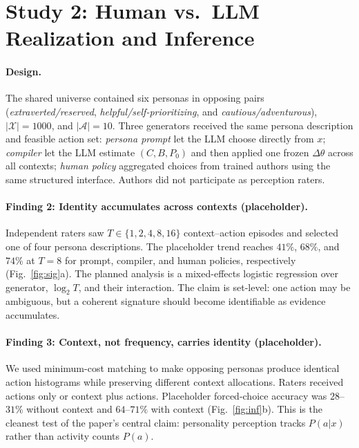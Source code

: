 \documentclass[letterpaper,10pt,conference]{ieeeconf}
\begin{document}
\section{Study 2: Human vs.\ LLM Realization and Inference}
\paragraph{Design.}
The shared universe contained six personas in opposing pairs (\emph{extraverted/reserved}, \emph{helpful/self-prioritizing}, and \emph{cautious/adventurous}), $|{\mathcal X}|{=}1000$, and $|{\mathcal A}|{=}10$. Three generators received the same persona description and feasible action set: \emph{persona prompt} let the LLM choose directly from $x$; \emph{compiler} let the LLM estimate $(C,B,P_0)$ and then applied one frozen $\Delta\theta$ across all contexts; \emph{human policy} aggregated choices from trained authors using the same structured interface. Authors did not participate as perception raters.

\paragraph{Finding 2: Identity accumulates across contexts (placeholder).}
Independent raters saw $T\in\{1,2,4,8,16\}$ context--action episodes and selected one of four persona descriptions. The placeholder trend reaches $41\%$, $68\%$, and $74\%$ at $T{=}8$ for prompt, compiler, and human policies, respectively (Fig.~\ref{fig:sig}a). The planned analysis is a mixed-effects logistic regression over generator, $\log_2T$, and their interaction. The claim is set-level: one action may be ambiguous, but a coherent signature should become identifiable as evidence accumulates.

\paragraph{Finding 3: Context, not frequency, carries identity (placeholder).}
We used minimum-cost matching to make opposing personas produce identical action histograms while preserving different context allocations. Raters received actions only or context plus actions. Placeholder forced-choice accuracy was $28$--$31\%$ without context and $64$--$71\%$ with context (Fig.~\ref{fig:inf}b). This is the cleanest test of the paper's central claim: personality perception tracks $P(a|x)$ rather than activity counts $P(a)$.
\end{document}
